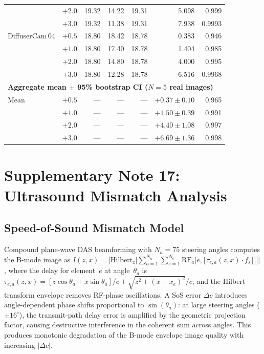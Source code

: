 \documentclass[11pt]{article}
\theoremstyle{definition}
\begin{document}
\begin{table}[htbp]
\begin{tabular}{l r r r r r r}
                & $+2.0$ & 19.32 & 14.22 & 19.31 & 5.098 & 0.999 \\
                & $+3.0$ & 19.32 & 11.38 & 19.31 & 7.938 & 0.9993 \\
DiffuserCam\,04 & $+0.5$ & 18.80 & 18.42 & 18.78 & 0.383 & 0.946 \\
                & $+1.0$ & 18.80 & 17.40 & 18.78 & 1.404 & 0.985 \\
                & $+2.0$ & 18.80 & 14.80 & 18.78 & 4.000 & 0.995 \\
                & $+3.0$ & 18.80 & 12.28 & 18.78 & 6.516 & 0.9968 \\
\midrule
\multicolumn{7}{l}{\textbf{Aggregate mean $\pm$ 95\% bootstrap CI ($N{=}5$ real images)}} \\
\midrule
Mean & $+0.5$ & --- & --- & --- & $+0.37 \pm 0.10$ & 0.965 \\
     & $+1.0$ & --- & --- & --- & $+1.50 \pm 0.39$ & 0.991 \\
     & $+2.0$ & --- & --- & --- & $+4.40 \pm 1.08$ & 0.997 \\
     & $+3.0$ & --- & --- & --- & $+6.69 \pm 1.36$ & 0.998 \\
\bottomrule
\end{tabular}
\end{table}



\section{Supplementary Note 17: Ultrasound Mismatch Analysis}
\label{sec:note_ultrasound}

\subsection{Speed-of-Sound Mismatch Model}
Compound plane-wave DAS beamforming with $N_a{=}75$ steering angles computes the B-mode image as $I(z,x) = \bigl|\mathrm{Hilbert}_z\bigl[\sum_{a=1}^{N_a}\sum_{e=1}^{N_e} \mathrm{RF}_a\bigl[e, \lfloor\tau_{e,a}(z,x)\cdot f_s\rfloor\bigr]\bigr]\bigr|$, where the delay for element~$e$ at angle~$\theta_a$ is $\tau_{e,a}(z,x) = [z\cos\theta_a + x\sin\theta_a]/c + \sqrt{z^2 + (x - x_e)^2}/c$, and the Hilbert-transform envelope removes RF-phase oscillations.
A SoS error $\Delta c$ introduces angle-dependent phase shifts proportional to $\sin(\theta_a)$: at large steering angles ($\pm 16^\circ$), the transmit-path delay error is amplified by the geometric projection factor, causing destructive interference in the coherent sum across angles. This produces monotonic degradation of the B-mode envelope image quality with increasing $|\Delta c|$.
\end{document}
